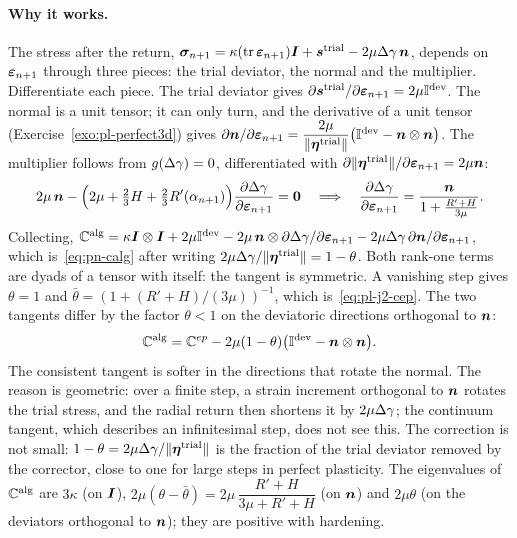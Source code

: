\paragraph{Why it works.} The stress after the return,
$\bm{\sigma}_{n+1}=\kappa(\operatorname{tr}\bm{\varepsilon}_{n+1})\bm{I}+\bm{s}^{\mathrm{trial}}-2\mu\Delta\gamma\,\bm{n}$, depends on
$\bm{\varepsilon}_{n+1}$ through three pieces: the trial deviator, the normal and the
multiplier. Differentiate each piece. The trial deviator gives
$\partial\bm{s}^{\mathrm{trial}}/\partial\bm{\varepsilon}_{n+1}=2\mu\mathbb{I}^{\mathrm{dev}}$. The normal is a unit
tensor; it can only turn, and the derivative of a unit tensor
(Exercise~\ref{exo:pl-perfect3d}) gives
$\partial\bm{n}/\partial\bm{\varepsilon}_{n+1}=\dfrac{2\mu}{\lVert \bm{\eta}^{\mathrm{trial}}\rVert}\bigl(\mathbb{I}^{\mathrm{dev}}-\bm{n}\otimes\bm{n}\bigr)$.
The multiplier follows from $g(\Delta\gamma)=0$, differentiated with
$\partial\lVert \bm{\eta}^{\mathrm{trial}}\rVert/\partial\bm{\varepsilon}_{n+1}=2\mu\bm{n}$:
\[
  2\mu\,\bm{n}-\Bigl(2\mu+\tfrac23H+\tfrac23R'(\alpha_{n+1})\Bigr)\frac{\partial\Delta\gamma}{\partial\bm{\varepsilon}_{n+1}}=\bm{0}
  \quad\Longrightarrow\quad
  \frac{\partial\Delta\gamma}{\partial\bm{\varepsilon}_{n+1}}=\frac{\bm{n}}{1+\frac{R'+H}{3\mu}} .
\]
Collecting,
$\mathbb{C}^{\mathrm{alg}}=\kappa\bm{I}\otimes\bm{I}+2\mu\mathbb{I}^{\mathrm{dev}}-2\mu\,\bm{n}\otimes\partial\Delta\gamma/\partial\bm{\varepsilon}_{n+1}-2\mu\Delta\gamma\,\partial\bm{n}/\partial\bm{\varepsilon}_{n+1}$,
which is~\eqref{eq:pn-calg} after writing $2\mu\Delta\gamma/\lVert \bm{\eta}^{\mathrm{trial}}\rVert=1-\theta$.
Both rank-one terms are dyads of a tensor with itself: the tangent is
symmetric. A vanishing step gives $\theta=1$ and
$\bar\theta=(1+(R'+H)/(3\mu))^{-1}$, which is~\eqref{eq:pl-j2-cep}.
The two tangents differ by the factor $\theta<1$ on the deviatoric directions
orthogonal to $\bm{n}$:
\[
  \mathbb{C}^{\mathrm{alg}}=\mathbb{C}^{ep}-2\mu(1-\theta)\bigl(\mathbb{I}^{\mathrm{dev}}-\bm{n}\otimes\bm{n}\bigr).
\]
The consistent tangent is softer in the directions that rotate the normal. The
reason is geometric: over a finite step, a strain increment orthogonal to
$\bm{n}$ rotates the trial stress, and the radial return then shortens it by
$2\mu\Delta\gamma$; the continuum tangent, which describes an infinitesimal step, does
not see this. The correction is not small: $1-\theta=2\mu\Delta\gamma/\lVert \bm{\eta}^{\mathrm{trial}}\rVert$
is the fraction of the trial deviator removed by the corrector, close to one
for large steps in perfect plasticity. The eigenvalues of $\mathbb{C}^{\mathrm{alg}}$ are $3\kappa$
(on $\bm{I}$), $2\mu(\theta-\bar\theta)=2\mu\,\dfrac{R'+H}{3\mu+R'+H}$ (on $\bm{n}$) and $2\mu\theta$
(on the deviators orthogonal to $\bm{n}$); they are positive with hardening.

